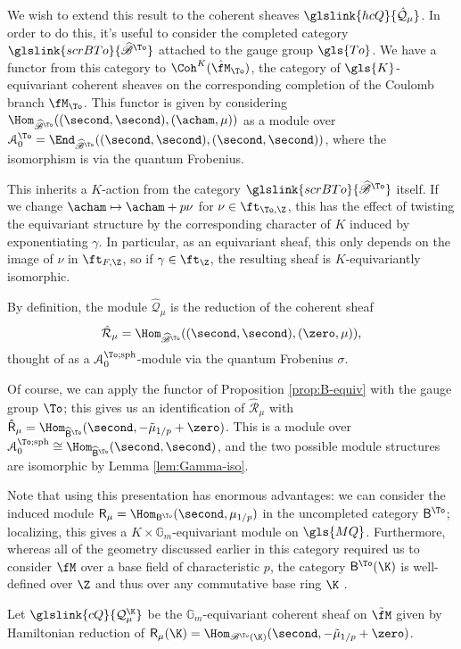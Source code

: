 We wish to extend this result to the coherent sheaves $\glslink{hcQ}{\mathcal{\hat Q}_\mu}$.  In order to do this, it's useful to  consider the completed category $\glslink{scrBTo}{\widehat{\mathscr{B}}^{\To}}$ attached to the gauge group $\gls{To}$.  We have a functor from this category to $\Coh^K(\hat{\fM}_{\To})$, the category of $\gls{K}$-equivariant coherent sheaves on the corresponding completion of the Coulomb branch $\fM _{\To}$.  This functor is given by considering $\Hom_{\widehat{\mathscr{B}}^{\To}}( (\second,\second),(\acham,\mu))$ as a module over $\EuScript{A}^{\To}_0=\End_{\widehat{\mathscr{B}}^{\To}}((\second, \second),(\second, \second))$, where the isomorphism is via the quantum Frobenius.

This inherits a $K$-action from the category $\glslink{scrBTo}{\widehat{\mathscr{B}}^{\To}}$ itself.  If we change $\acham\mapsto \acham+p\nu$ for $\nu \in \ft_{\To,\Z}$, this has the effect of twisting the equivariant structure by the corresponding character of $K$ induced by exponentiating $\gamma$. In particular, as an equivariant sheaf, this only depends on the image of $\nu$ in $\ft_{F,\Z}$, so if $\gamma\in \ft_{\Z}$, the resulting sheaf is $K$-equivariantly isomorphic.

By definition, the module $\mathcal{\hat Q}_\mu$ is the reduction of the coherent sheaf \[\mathcal{\hat R}_\mu=\Hom_{\widehat{\mathscr{B}}^{\To}}( (\second,\second),(\zero,\mu)),\] thought of as a $\EuScript{A}^{\To;\operatorname{sph}}_0$-module via the quantum Frobenius $\sigma$.  

Of course, we can apply the functor of Proposition \ref{prop:B-equiv} with the gauge group $\To$;  this gives us an identification of $\mathcal{\hat R}_\mu$ with $\mathsf{\hat R}_\mu=\Hom_{\widehat{\mathsf{B}}^{\To}}( \second,-\tilde{\mu}_{1/p}+\zero)$.  This is a module over $\EuScript{A}^{\To;\operatorname{sph}}_0\cong \Hom_{\widehat{\mathsf{B}}^{\To}}( \second,\second)$, and the two possible module structures are isomorphic  by Lemma \ref{lem:Gamma-iso}.

Note that using this presentation has enormous advantages: we can consider the induced module $\mathsf{ R}_\mu=\Hom_{{\mathsf{B}}^{\To}}( \second,\mu_{1/p})$ in the uncompleted category ${\mathsf{B}}^{\To}$; localizing, this gives a $K\times \mathbb{G}_m$-equivariant module on $\gls{MQ}$. Furthermore, whereas all of the geometry discussed earlier in this category required us to consider $\fM$ over a base field of  characteristic $p$, the category $ {\mathsf{B}}^{\To}(\K)$ is well-defined over $\Z$ and thus over any commutative base ring $\K$ .  
\begin{definition}
Let $\glslink{cQ}{\mathcal{Q}_\mu^{\K}}$ be the $\mathbb{G}_m$-equivariant coherent sheaf on $\tilde{\fM}$ given by Hamiltonian reduction of $ \mathsf{ R}_\mu(\K)=\Hom_{{\mathscr{B}}^{\To}(\K)}( \second,-\tilde{\mu}_{1/p}+\zero)$.
\end{definition}





